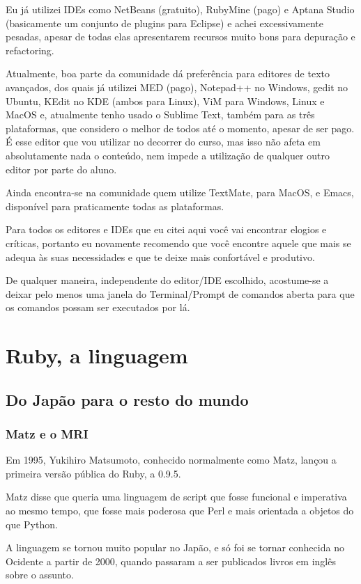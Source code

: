 \documentclass[12pt]{book} %
\begin{document}
Eu já utilizei IDEs como NetBeans (gratuito), RubyMine (pago) e Aptana Studio (basicamente um conjunto de plugins para Eclipse) e achei excessivamente pesadas, apesar de todas elas apresentarem recursos muito bons para depuração e refactoring.

Atualmente, boa parte da comunidade dá preferência para editores de texto avançados, dos quais já utilizei MED (pago), Notepad++ no Windows, gedit no Ubuntu, KEdit no KDE (ambos para Linux), ViM para Windows, Linux e MacOS e, atualmente tenho usado o Sublime Text, também para as três plataformas, que considero o melhor de todos até o momento, apesar de ser pago. É esse editor que vou utilizar no decorrer do curso, mas isso não afeta em absolutamente nada o conteúdo, nem impede a utilização de qualquer outro editor por parte do aluno.

Ainda encontra-se na comunidade quem utilize TextMate, para MacOS, e Emacs, disponível para praticamente todas as plataformas. 

Para todos os editores e IDEs que eu citei aqui você vai encontrar elogios e críticas, portanto eu novamente recomendo que você encontre aquele que mais se adequa às suas necessidades e que te deixe mais confortável e produtivo.

De qualquer maneira, independente do editor/IDE escolhido, acostume-se a deixar pelo menos uma janela do Terminal/Prompt de comandos aberta para que os comandos possam ser executados por lá.

\chapter{Ruby, a linguagem}

\section{Do Japão para o resto do mundo}

\subsection{Matz e o MRI}

Em 1995, Yukihiro Matsumoto, conhecido normalmente como Matz, lançou a primeira versão pública do Ruby, a 0.9.5.

Matz disse que queria uma linguagem de script que fosse funcional e imperativa ao mesmo tempo, que fosse mais poderosa que Perl e mais orientada a objetos do que Python.

A linguagem se tornou muito popular no Japão, e só foi se tornar conhecida no Ocidente a partir de 2000, quando passaram a ser publicados livros em inglês sobre o assunto.
\end{document}

